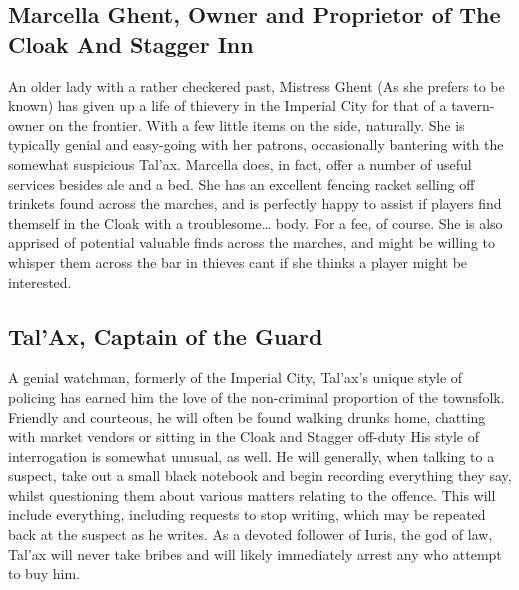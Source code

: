 \subsection{Marcella Ghent, Owner and Proprietor of The Cloak And Stagger Inn}
An older lady with a rather checkered past, Mistress Ghent (As she prefers to be known) has given up a life of thievery in the Imperial City for that of a tavern-owner on the frontier. With a few little items on the side, naturally. She is typically genial and easy-going with her patrons, occasionally bantering with the somewhat suspicious Tal’ax. 
\newline
Marcella does, in fact, offer a number of useful services besides ale and a bed. She has an excellent fencing racket selling off trinkets found across the marches, and is perfectly happy to assist if players find themself in the Cloak with a troublesome… body. For a fee, of course. 
\newline
She is also apprised of potential valuable finds across the marches, and might be willing to whisper them across the bar in thieves cant if she thinks a player might be interested.  

\subsection{Tal'Ax, Captain of the Guard}
A genial watchman, formerly of the Imperial City, Tal’ax’s unique style of policing has earned him the love of the non-criminal proportion of the townsfolk. Friendly and courteous, he will often be found walking drunks home, chatting with market vendors or sitting in the Cloak and Stagger off-duty
\newline
His style of interrogation is somewhat unusual, as well. He will generally, when talking to a suspect, take out a small black notebook and begin recording everything they say, whilst questioning them about various matters relating to the offence. This will include everything, including requests to stop writing, which may be repeated back at the suspect as he writes. 
\newline
As a devoted follower of Iuris, the god of law, Tal’ax will never take bribes and will likely immediately arrest any who attempt to buy him.

